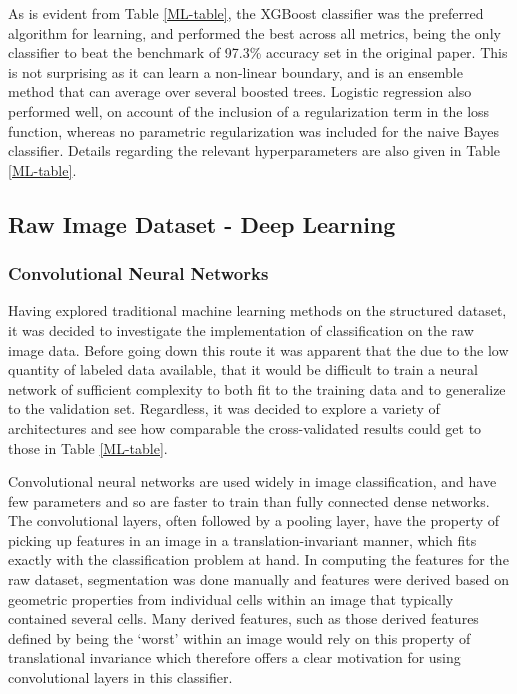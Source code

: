 \documentclass{article}
\begin{document}
	
	As is evident from Table \ref{ML-table}, the XGBoost classifier was the preferred algorithm for learning, and performed the best across all metrics, being the only classifier to beat the benchmark of 97.3\% accuracy set in the original paper. This is not surprising as it can learn a non-linear boundary, and is an ensemble method that can average over several boosted trees. Logistic regression also performed well, on account of the inclusion of a regularization term in the loss function, whereas no parametric regularization was included for the naive Bayes classifier. Details regarding the relevant hyperparameters are also given in Table \ref{ML-table}.

	\subsection{Raw Image Dataset - Deep Learning}
	\subsubsection{Convolutional Neural Networks}
	Having explored traditional machine learning methods on the structured dataset, it was decided to investigate the implementation of classification on the raw image data. Before going down this route it was apparent that the due to the low quantity of labeled data available, that it would be difficult to train a neural network of sufficient complexity to both fit to the training data and to generalize to the validation set. Regardless, it was decided to explore a variety of architectures and see how comparable the cross-validated results could get to those in Table \ref{ML-table}. 
	
	Convolutional neural networks are used widely in image classification, and have few parameters and so are faster to train than fully connected dense networks. The convolutional layers, often followed by a pooling layer, have the property of picking up features in an image in a translation-invariant manner, which fits exactly with the classification problem at hand. In computing the features for the raw dataset, segmentation was done manually and features were derived based on geometric properties from individual cells within an image that typically contained several cells. Many derived features, such as those derived features defined by being the `worst' within an image would rely on this property of translational invariance which therefore offers a clear motivation for using convolutional layers in this classifier.
	
\end{document}

